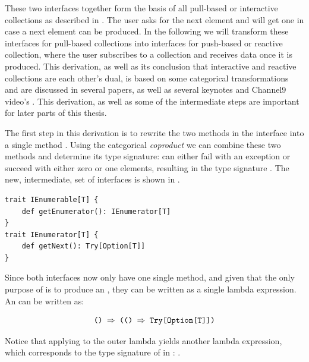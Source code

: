 These two interfaces together form the basis of all pull-based or interactive collections as described in . The user asks for the next element and will get one in case a next element can be produced. In the following we will transform these interfaces for pull-based collections into interfaces for push-based or reactive collection, where the user subscribes to a collection and receives data once it is produced. This derivation, as well as its conclusion that interactive and reactive collections are each other's dual, is based on some categorical transformations and are discussed in several papers, as well as several keynotes and Channel9 video's \cite{meijer2010-Observable, meijer2012-YMIAD, E2E-Rx, meijer2014-Duality-And-The-End-Of-Reactive}. This derivation, as well as some of the intermediate steps are important for later parts of this thesis.

The first step in this derivation is to rewrite the two methods in the \ier interface into a single method . Using the categorical \textit{coproduct} \cite{rydeheard1988-Category-Theory} we can combine these two methods and determine its type signature:  can either fail with an exception or succeed with either zero or one elements, resulting in the type signature . The new, intermediate, set of interfaces is shown in .

\begin{minipage}{\linewidth}
\begin{lstlisting}[style=ScalaStyle, caption={\ier interface after applying coproduct}, label={lst:itb-itr-interm}]
trait IEnumerable[T] {
    def getEnumerator(): IEnumerator[T]
}
trait IEnumerator[T] {
    def getNext(): Try[Option[T]]
}
\end{lstlisting}
\end{minipage}

Since both interfaces now only have one single method, and given that the only purpose of \ieb is to produce an \ier, they can be written as a single lambda expression. An \ieb can be written as:

\begin{equation} \label{eq:itb}
\code{() $\Rightarrow$ (() $\Rightarrow$ Try[Option[T]])}
\end{equation}

Notice that applying  to the outer lambda yields another lambda expression, which corresponds to the type signature of  in : .

